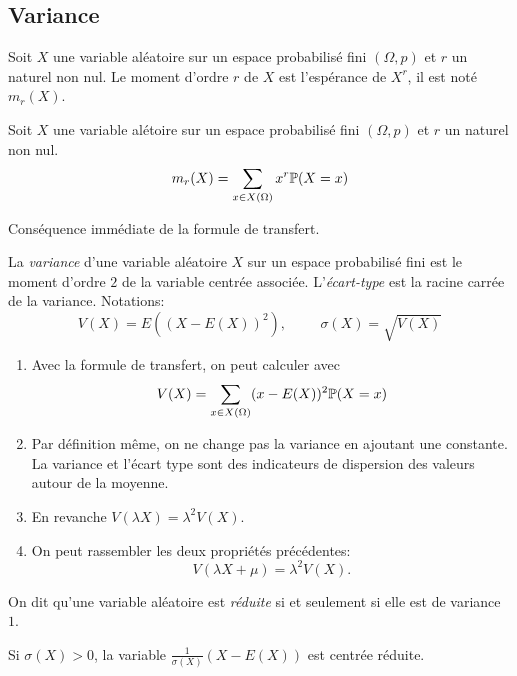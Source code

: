 \subsection{Variance}
\begin{defi}[moments]
 Soit $X$ une variable aléatoire sur un espace probabilisé fini $(\Omega,p)$ et $r$ un naturel non nul. Le moment d'ordre $r$ de $X$ est l'espérance de $X^r$, il est noté $m_r(X)$.
\end{defi}
\begin{prop}
 Soit $X$ une variable alétoire sur un espace probabilisé fini $(\Omega,p)$ et $r$ un naturel non nul.
\begin{displaymath}
 m_r(X)=\sum_{x\in X(\Omega)}x^r\mathbb{P}(X=x)
\end{displaymath}
\end{prop}
\begin{demo}
 Conséquence immédiate de la formule de transfert.
\end{demo}
\begin{defi}
 La \emph{variance} d'une variable aléatoire $X$ sur un espace probabilisé fini est le moment d'ordre $2$ de la variable centrée associée. L'\emph{écart-type} est la racine carrée de la variance. Notations:
\begin{displaymath}
 V(X) = E((X-E(X))^2),\hspace{1cm}\sigma(X)=\sqrt{V(X)}
\end{displaymath}
\end{defi}
\begin{rems}
 \begin{enumerate}
  \item Avec la formule de transfert, on peut calculer avec
\begin{displaymath}
 V(X) = \sum_{x\in X(\Omega)}(x-E(X))^2\mathbb{P}(X=x)
\end{displaymath}

\item Par définition même, on ne change pas la variance en ajoutant une constante. La variance et l'écart type sont des indicateurs de dispersion des valeurs autour de la moyenne.
\item En revanche $V(\lambda X)=\lambda^2V(X)$.
\item On peut rassembler les deux propriétés précédentes:
\begin{displaymath}
 V(\lambda X +\mu) = \lambda^2 V(X).
\end{displaymath}
 \end{enumerate}
\end{rems}
\newpage
{}
\begin{defi}
 On dit qu'une variable aléatoire est \emph{réduite} si et seulement si elle est de variance $1$.
\end{defi}
\begin{rem}
 Si $\sigma(X)>0$, la variable $\frac{1}{\sigma(X)}\left(X -E(X) \right)$ est centrée réduite.
\end{rem}

